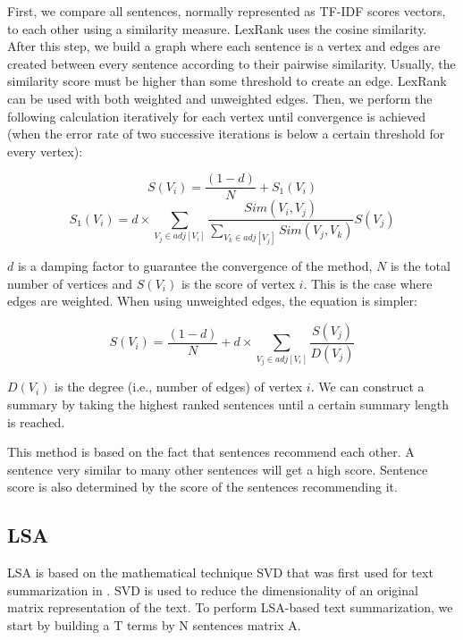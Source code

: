 \documentclass[11pt,onecolumn,draftcls]{IEEEtran}
\begin{document}
First, we compare all sentences, normally represented as \ac{TF-IDF} scores
vectors, to each other using a similarity measure. LexRank uses the cosine
similarity. After this step, we build a graph where each sentence is a vertex
and edges are created between every sentence according to their pairwise
similarity. Usually, the similarity score must be higher than some threshold to
create an edge. LexRank can be used with both weighted and unweighted edges.
Then, we perform the following calculation iteratively for each vertex until
convergence is achieved (when the error rate of two successive iterations is
below a certain threshold for every vertex):

\begin{equation}
S\left(V_{i}\right)=\frac{\left(1-d\right)}{N}+ S_{1}\left(V_i\right)
\end{equation}
\begin{equation}
S_{1}\left(V_{i}\right)=d\times\sum_{V_{j}\in
adj\left[V_{i}\right]}\frac{Sim\left(V_{i},V_{j}\right)}{\sum_{V_{k}\in adj\left[V_{j}\right]}Sim\left(V_{j},V_{k}\right)}S\left(V_{j}\right)
\end{equation}

$d$ is a damping factor to guarantee the convergence of the method, $N$ is
the total number of vertices and $S\left(V_{i}\right)$ is the score of vertex
$i$. This is the case where edges are weighted. When using unweighted edges, the
equation is simpler:

\begin{equation}
S\left(V_{i}\right)=\frac{\left(1-d\right)}{N}+d\times\sum_{V_{j}\in
adj\left[V_{i}\right]}\frac{S\left(V_{j}\right)}{D\left(V_{j}\right)}
\end{equation}

$D\left(V_{i}\right)$ is the degree (i.e., number of edges) of vertex $i$. We
can construct a summary by taking the highest ranked sentences until a certain
summary length is reached.

This method is based on the fact that sentences recommend each other. A
sentence very similar to many other sentences will get a high score.
Sentence score is also determined by the score of the sentences recommending it.

\subsection{\acl{LSA}\label{sub:lsa}}
\ac{LSA} is based on the mathematical technique \ac{SVD} that was first
used for text summarization in \cite{Gong2001}. \ac{SVD} is used to
reduce the dimensionality of an original matrix representation of the text. To perform
\ac{LSA}-based text summarization, we start by building a T terms by N sentences
matrix A.
\end{document}
